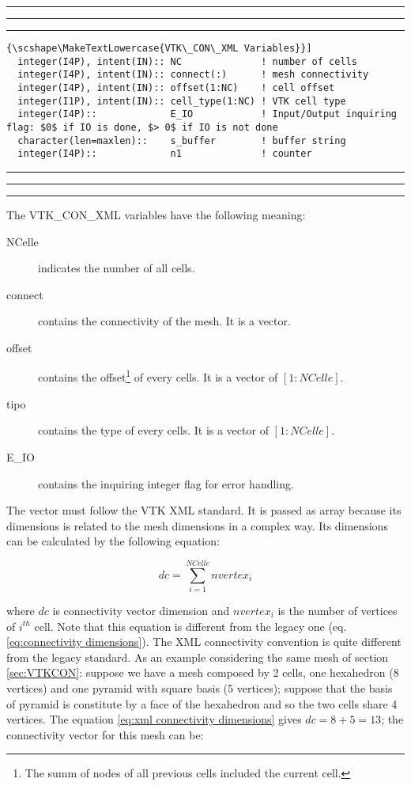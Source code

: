 \documentclass[pagesize=pdftex,fontsize=10pt,paper=a4,oneside]{scrbook}
\DeclareRobustCommand{\MarginNote}[1]{\marginpar{%
\slshape\footnotesize%
\parindent=0pt\lineskip=0pt\lineskiplimit=0pt%
\tolerance=2000\hyphenpenalty=300\exhyphenpenalty=300%
\doublehyphendemerits=100000\finalhyphendemerits=\doublehyphendemerits%
\raggedright\hspace{0pt}#1}}
\newenvironment{boxred}[1]%
               {%
                \noindent\hspace*{-0.025\textwidth}%
                \color{Maroon}%
                \rule[-5.8pt]{0.6pt}{6pt}\hspace*{-0.6pt}\rule{1.05\textwidth}{0.6pt}\hspace*{-0.6pt}\rule[-5.8pt]{0.6pt}{6pt}%
                \color{black}%
                \vspace*{0.6pt}\MarginNote{\color{Maroon}{#1}}%
               }%
               {%
                \noindent\hspace*{-0.025\textwidth}%
                \color{Maroon}%
                \rule[0pt]{0.6pt}{6pt}\hspace*{-0.6pt}\rule{1.05\textwidth}{0.6pt}\hspace*{-0.6pt}\rule[0pt]{0.6pt}{6pt}%
                \color{black}%
                \vspace*{2mm}%
               }
\DeclareRobustCommand{\MaiuscolettoBS}[1]{\textls[80]{\scshape\MakeTextLowercase{#1}}}
\begin{document}
 
\begin{boxred}{}
\begin{lstlisting}[style=variables,title=\color{Maroon}\MaiuscolettoBS{VTK\_CON\_XML Variables}]
  integer(I4P), intent(IN):: NC              ! number of cells
  integer(I4P), intent(IN):: connect(:)      ! mesh connectivity
  integer(I4P), intent(IN):: offset(1:NC)    ! cell offset
  integer(I1P), intent(IN):: cell_type(1:NC) ! VTK cell type
  integer(I4P)::             E_IO            ! Input/Output inquiring flag: $0$ if IO is done, $> 0$ if IO is not done
  character(len=maxlen)::    s_buffer        ! buffer string
  integer(I4P)::             n1              ! counter
\end{lstlisting}

\end{boxred}
 
The VTK\_CON\_XML variables have the following meaning:

\begin{description}
 \item[{\color{RoyalBlue}NCelle}] indicates the number of all cells.
 \item[{\color{RoyalBlue}connect}] contains the connectivity of the mesh. It is a vector.
 \item[{\color{RoyalBlue}offset}] contains the offset\footnote{The summ of nodes of all previous cells included the
                                  current cell.} of every cells. It is a vector of $[1:NCelle]$.
 \item[{\color{RoyalBlue}tipo}] contains the type of every cells. It is a vector of $[1:NCelle]$.
 \item[{\color{RoyalBlue}E\_IO}] contains the inquiring integer flag for error handling.
\end{description}

The vector \MaiuscolettoBS{connect} must follow the VTK XML standard. It is passed as \MaiuscolettoBS{assumed-shape}
array because its dimensions is related to the mesh dimensions in a complex way. Its dimensions can be calculated by
the following equation:

\begin{equation}
dc = \sum\limits_{i = 1}^{NCelle} {nvertex_i }
\label{eq:xml connectivity dimensions}
\end{equation}

\noindent where $dc$ is connectivity vector dimension and $nvertex_i$ is the number of vertices of $i^{th}$ cell.
Note that this equation is different from the legacy one (eq. \ref{eq:connectivity dimensions}). The XML connectivity
convention is quite different from the legacy standard. As an example considering the same mesh of section \ref{sec:VTKCON}:
suppose we have a mesh composed by 2 cells, one hexahedron (8 vertices) and one pyramid with square basis (5 vertices);
suppose that the basis of pyramid is constitute by a face of the hexahedron and so the two cells share 4 vertices. The
equation \ref{eq:xml connectivity dimensions} gives $dc=8+5=13$; the connectivity vector for this mesh can be:
\end{document}
